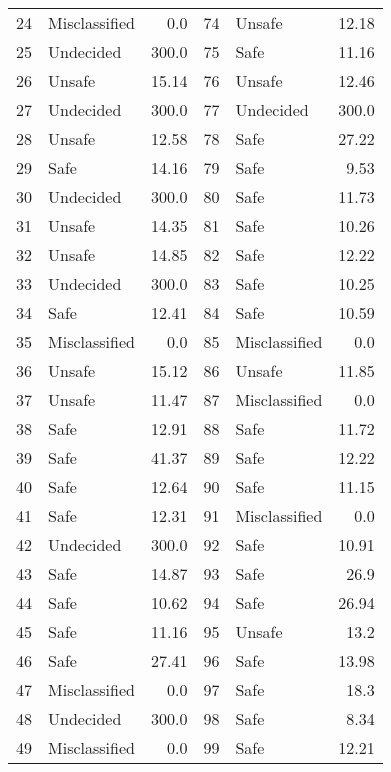 \begin{table}[!ht]
\begin{tabular}{|llr|llr|}
    24 & Misclassified & 0.0 &    74 & Unsafe & 12.18\\ 
    25 & Undecided & 300.0 &    75 & Safe & 11.16\\ 
    26 & Unsafe & 15.14 &    76 & Unsafe & 12.46\\ 
    27 & Undecided & 300.0 &    77 & Undecided & 300.0\\ 
    28 & Unsafe & 12.58 &    78 & Safe & 27.22\\ 
    29 & Safe & 14.16 &    79 & Safe & 9.53\\ 
    30 & Undecided & 300.0 &    80 & Safe & 11.73\\ 
    31 & Unsafe & 14.35 &    81 & Safe & 10.26\\ 
    32 & Unsafe & 14.85 &    82 & Safe & 12.22\\ 
    33 & Undecided & 300.0 &    83 & Safe & 10.25\\ 
    34 & Safe & 12.41 &    84 & Safe & 10.59\\ 
    35 & Misclassified & 0.0 &    85 & Misclassified & 0.0\\ 
    36 & Unsafe & 15.12 &    86 & Unsafe & 11.85\\ 
    37 & Unsafe & 11.47 &    87 & Misclassified & 0.0\\ 
    38 & Safe & 12.91 &    88 & Safe & 11.72\\ 
    39 & Safe & 41.37 &    89 & Safe & 12.22\\ 
    40 & Safe & 12.64 &    90 & Safe & 11.15\\ 
    41 & Safe & 12.31 &    91 & Misclassified & 0.0\\ 
    42 & Undecided & 300.0 &    92 & Safe & 10.91\\ 
    43 & Safe & 14.87 &    93 & Safe & 26.9\\ 
    44 & Safe & 10.62 &    94 & Safe & 26.94\\ 
    45 & Safe & 11.16 &    95 & Unsafe & 13.2\\ 
    46 & Safe & 27.41 &    96 & Safe & 13.98\\ 
    47 & Misclassified & 0.0 &    97 & Safe & 18.3\\ 
    48 & Undecided & 300.0 &    98 & Safe & 8.34\\ 
    49 & Misclassified & 0.0 &    99 & Safe & 12.21\\ 
    \bottomrule
  \end{tabular}
\end{table}

